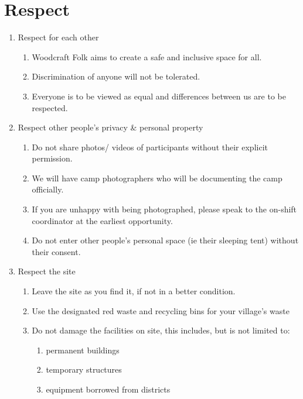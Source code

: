 \documentclass[a4paper, 11pt]{report}
\def\enumMarginIndentOne{4em}
\def\enumMarginIndentTwo{5em}
\begin{document}
    \chapter{Respect}
    \begin{enumerate}
        \item Respect for each other
        \begin{enumerate}[leftmargin=\enumMarginIndentOne]
            \item Woodcraft Folk aims to create a safe and inclusive space for all.
            \item Discrimination of anyone will not be tolerated.
            \item Everyone is to be viewed as equal and differences between us are to be respected. 
        \end{enumerate}
        \item Respect other people's privacy \& personal property
        \begin{enumerate}[leftmargin=\enumMarginIndentOne]
            \item Do not share photos/ videos of participants without their explicit permission. 
            \item We will have camp photographers who will be documenting the camp officially. 
            \item If you are unhappy with being photographed, please speak to the on-shift coordinator at the earliest opportunity.
            \item Do not enter other people's personal space (ie their sleeping tent) without their consent.
        \end{enumerate}
        \item Respect the site
        \begin{enumerate}[leftmargin=\enumMarginIndentOne]
            \item Leave the site as you find it, if not in a better condition.
            \item Use the designated red waste and recycling bins for your village's waste
            \item Do not damage the facilities on site, this includes, but is not limited to: 
            \begin{enumerate}[leftmargin=\enumMarginIndentTwo]
                \item permanent buildings
                \item temporary structures
                \item equipment borrowed from districts

\end{enumerate}
\end{enumerate}
\end{enumerate}
\end{document}
